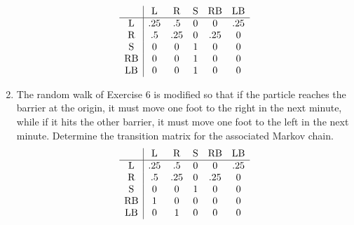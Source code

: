 \documentclass{hw}
\begin{document}
\begin{enumerate}
\begin{minipage}{0.5\textwidth}
\[
\begin{array}{c | c c c c c}
& \text{L} & \text{R} & \text{S} & \text{RB} & \text{LB}\\
\hline
\text{L} & .25 & .5 & 0 & 0 & .25\\
\text{R} & .5 & .25 & 0 & .25 & 0\\
\text{S} & 0 & 0 & 1 & 0 & 0\\
\text{RB} & 0 & 0 & 1 & 0 & 0\\
\text{LB} & 0 & 0 & 1 & 0 & 0
\end{array}
\]
\end{minipage}
\begin{minipage}{0.5\textwidth}
\begin{center}
\end{center}
\end{minipage}

\item The random walk of Exercise 6 is modified so that if the particle reaches the barrier at the
origin, it must move one foot to the right in the next minute, while if it hits the other barrier,
it must move one foot to the left in the next minute. Determine the transition matrix for the
associated Markov chain.
\[
\begin{array}{c | c c c c c}
& \text{L} & \text{R} & \text{S} & \text{RB} & \text{LB}\\
\hline
\text{L} & .25 & .5 & 0 & 0 & .25\\
\text{R} & .5 & .25 & 0 & .25 & 0\\
\text{S} & 0 & 0 & 1 & 0 & 0\\
\text{RB} & 1 & 0 & 0 & 0 & 0\\
\text{LB} & 0 & 1 & 0 & 0 & 0
\end{array}
\]


\end{enumerate}
\end{document}
